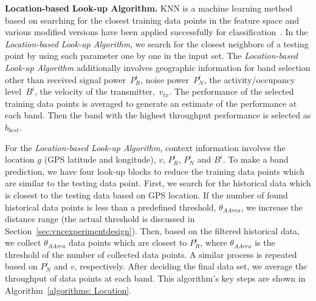 
{\bf Location-based Look-up Algorithm.} KNN is a machine learning method
based on searching for the closest training data points in the feature space and various
modified versions have been applied successfully for classification~\cite{zhang2006svm}.
In the {\it Location-based Look-up Algorithm}, we search for the closest neighbors of 
a testing point by using each parameter one by one in the input set. 
The {\it Location-based Look-up Algorithm} additionally involves geographic information for band selection other than received signal power~$P_R^i$, noise power~$P_N^i$, the activity/occupancy level~$B^i$, the velocity of the transmitter,~$v_{tx}$.
The 
performance of the selected training data points is averaged to generate an estimate of the performance at each band. Then
the band with the highest throughput performance is selected as $b_{best}$.

For the {\it Location-based Look-up Algorithm}, 
context information involves the location $g$ (GPS latitude and longitude), $v$, $P_R^i$, $P_N^i$ 
and $B^i$. To make a band prediction, we have four look-up blocks to reduce
the training data points which are similar to the testing data point. First,
we search for the historical data which is closest to the testing data based on GPS location.
If the number of found historical data points is less than a predefined threshold, 
 $\theta_{AArea}$, we increase the distance range (the actual threshold is discussed in 
Section~\ref{sec:vncexperimentdesign}). Then, based on the filtered historical data,
we collect $\theta_{AArea}$ data points which are closest to $P_R^i$, where $\theta_{AArea}$ is the threshold of the number of collected data points. 
A similar process is repeated based on $P_N^i$ and $v$, respectively.
After deciding the final data set, we average the throughput of data points at each band.
This algorithm's key steps are shown in Algorithm~\ref{algorithms: Location}.


